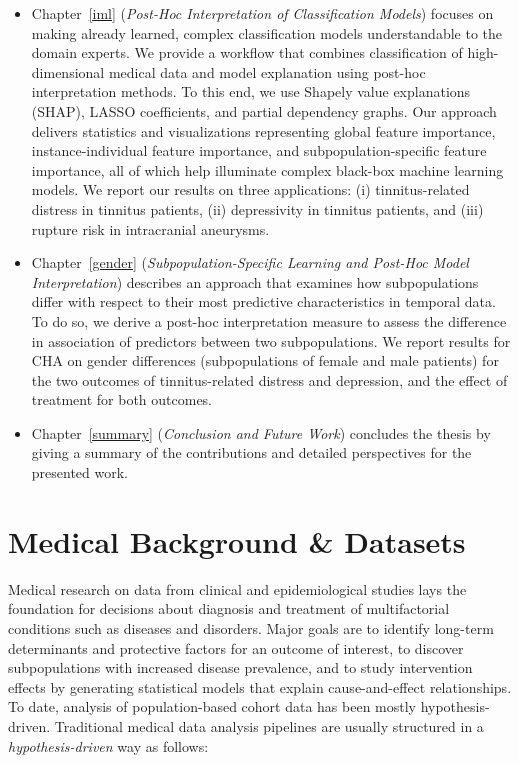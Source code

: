 \documentclass[
  oneside]{book}
\begin{document}
\begin{itemize}
\item
  Chapter~\ref{iml} (\emph{Post-Hoc Interpretation of Classification Models}) focuses on making already learned, complex classification models understandable to the domain experts. We provide a workflow that combines classification of high-dimensional medical data and model explanation using post-hoc interpretation methods.
  To this end, we use Shapely value explanations (SHAP), LASSO coefficients, and partial dependency graphs.
  Our approach delivers statistics and visualizations representing global feature importance, instance-individual feature importance, and subpopulation-specific feature importance, all of which help illuminate complex black-box machine learning models.
  We report our results on three applications: (i) tinnitus-related distress in tinnitus patients, (ii) depressivity in tinnitus patients, and (iii) rupture risk in intracranial aneurysms.
\item
  Chapter~\ref{gender} (\emph{Subpopulation-Specific Learning and Post-Hoc Model Interpretation}) describes an approach that examines how subpopulations differ with respect to their most predictive characteristics in temporal data. To do so, we derive a post-hoc interpretation measure to assess the difference in association of predictors between two subpopulations. We report results for CHA on gender differences (subpopulations of female and male patients) for the two outcomes of tinnitus-related distress and depression, and the effect of treatment for both outcomes.
\item
  Chapter~\ref{summary} (\emph{Conclusion and Future Work}) concludes the thesis by giving a summary of the contributions and detailed perspectives for the presented work.
\end{itemize}

\hypertarget{background}{%
\chapter{Medical Background \& Datasets}\label{background}}

Medical research on data from clinical and epidemiological studies lays the foundation for decisions about diagnosis and treatment of multifactorial conditions such as diseases and disorders.
Major goals are to identify long-term determinants and protective factors for an outcome of interest, to discover subpopulations with increased disease prevalence, and to study intervention effects by generating statistical models that explain cause-and-effect relationships.
To date, analysis of population-based cohort data has been mostly hypothesis-driven.
Traditional medical data analysis pipelines are usually structured in a \emph{hypothesis-driven} way as follows:
\end{document}
